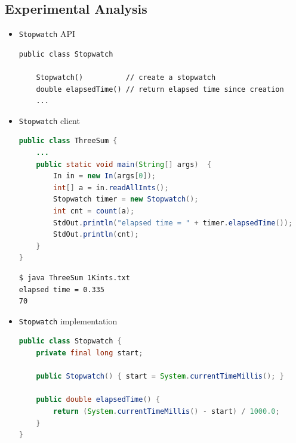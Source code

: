 \documentclass[8pt,a4paper,compress]{beamer}
\begin{document}
\subsection*{Experimental Analysis}
\begin{frame}[fragile]
\begin{itemize}
\item \lstinline{Stopwatch} API
\begin{lstlisting}[language={}]
public class Stopwatch

    Stopwatch()          // create a stopwatch
    double elapsedTime() // return elapsed time since creation
    ...
\end{lstlisting}

\item \lstinline{Stopwatch} client
\begin{lstlisting}[language=Java]
public class ThreeSum {
    ...
    public static void main(String[] args)  { 
        In in = new In(args[0]);
        int[] a = in.readAllInts();
        Stopwatch timer = new Stopwatch();
        int cnt = count(a);
        StdOut.println("elapsed time = " + timer.elapsedTime());
        StdOut.println(cnt);
    } 
}
\end{lstlisting}

\begin{lstlisting}[language={}]
$ java ThreeSum 1Kints.txt 
elapsed time = 0.335
70
\end{lstlisting}

\item \lstinline{Stopwatch} implementation
\begin{lstlisting}[language=Java]
public class Stopwatch {
    private final long start;
    
    public Stopwatch() { start = System.currentTimeMillis(); }
    
    public double elapsedTime() {
        return (System.currentTimeMillis() - start) / 1000.0;
    }
}
\end{lstlisting}
\end{itemize}
\end{frame}
\end{document}
